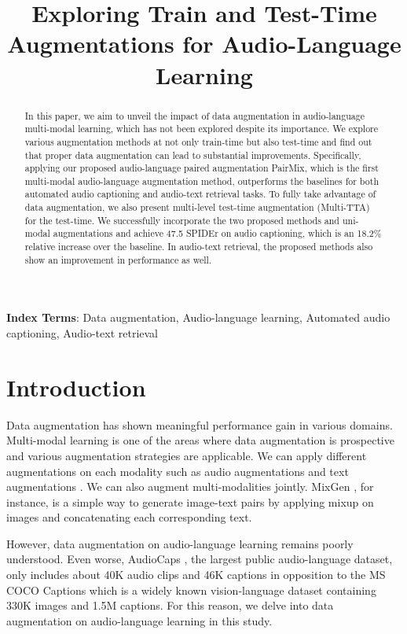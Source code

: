 \documentclass{INTERSPEECH2023}
\title{Exploring Train and Test-Time Augmentations for Audio-Language Learning}
\begin{document}
\maketitle

\begin{abstract}
In this paper, we aim to unveil the impact of data augmentation in audio-language multi-modal learning, which has not been explored despite its importance. We explore various augmentation methods at not only train-time but also test-time and find out that proper data augmentation can lead to substantial improvements. Specifically, applying our proposed audio-language paired augmentation PairMix, which is the first multi-modal audio-language augmentation method, outperforms the baselines for both automated audio captioning and audio-text retrieval tasks. To fully take advantage of data augmentation, we also present multi-level test-time augmentation (Multi-TTA) for the test-time. We successfully incorporate the two proposed methods and uni-modal augmentations and achieve 47.5 SPIDEr on audio captioning, which is an 18.2\% relative increase over the baseline. In audio-text retrieval, the proposed methods also show an improvement in performance as well.

\end{abstract}
\noindent\textbf{Index Terms}: Data augmentation, Audio-language learning, Automated audio captioning, Audio-text retrieval



\section{Introduction}
\label{sec:intro}

Data augmentation has shown meaningful performance gain in various domains. Multi-modal learning is one of the areas where data augmentation is prospective and various augmentation strategies are applicable. We can apply different augmentations on each modality such as audio augmentations \cite{park2019specaugment, wang2021specaugment++} and text augmentations \cite{wei2019eda, edunov2018understanding}. We can also augment multi-modalities jointly. MixGen \cite{hao2023mixgen}, for instance, is a simple way to generate image-text pairs by applying mixup \cite{zhang2018mixup} on images and concatenating each corresponding text.

However, data augmentation on audio-language learning remains poorly understood. Even worse, AudioCaps \cite{kim2019audiocaps}, the largest public audio-language dataset, only includes about 40K audio clips and 46K captions in opposition to the MS COCO Captions \cite{lin2014microsoft} which is a widely known vision-language dataset containing 330K images and 1.5M captions.
For this reason, we delve into data augmentation on audio-language learning in this study.
\end{document}
